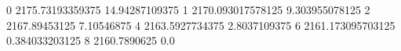 0 2175.73193359375 14.94287109375
1 2170.093017578125 9.303955078125
2 2167.89453125 7.10546875
4 2163.5927734375 2.8037109375
6 2161.173095703125 0.384033203125
8 2160.7890625 0.0
